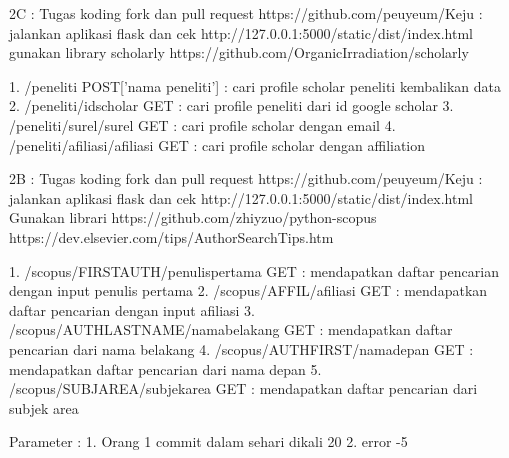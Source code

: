 2C :
Tugas koding fork dan pull request https://github.com/peuyeum/Keju :
jalankan aplikasi flask dan cek http://127.0.0.1:5000/static/dist/index.html
gunakan library scholarly https://github.com/OrganicIrradiation/scholarly

1. /peneliti POST['nama peneliti'] : cari profile scholar peneliti kembalikan data
2. /peneliti/{idscholar} GET : cari profile peneliti dari id google scholar
3. /peneliti/surel/{surel} GET : cari profile scholar dengan email
4. /peneliti/afiliasi/{afiliasi} GET : cari profile scholar dengan affiliation


2B :
Tugas koding fork dan pull request https://github.com/peuyeum/Keju :
jalankan aplikasi flask dan cek http://127.0.0.1:5000/static/dist/index.html
Gunakan librari https://github.com/zhiyzuo/python-scopus
https://dev.elsevier.com/tips/AuthorSearchTips.htm

1. /scopus/FIRSTAUTH/{penulispertama} GET : mendapatkan daftar pencarian dengan input penulis pertama
2. /scopus/AFFIL/{afiliasi} GET : mendapatkan daftar pencarian dengan input afiliasi
3. /scopus/AUTHLASTNAME/{namabelakang} GET : mendapatkan daftar pencarian dari nama belakang
4. /scopus/AUTHFIRST/{namadepan} GET : mendapatkan daftar pencarian dari nama depan
5. /scopus/SUBJAREA/{subjekarea} GET : mendapatkan daftar pencarian dari subjek area



Parameter :
1. Orang 1 commit dalam sehari dikali 20
2. error -5